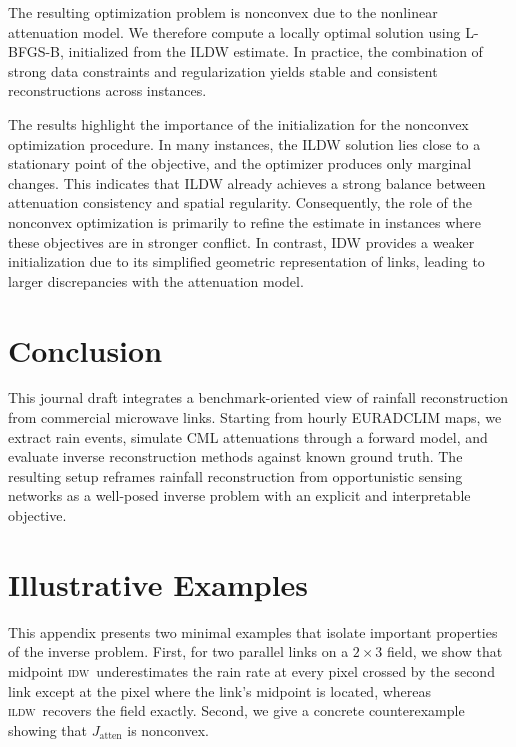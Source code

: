 \documentclass[a4paper,fleqn]{cas-sc}
\DeclareRobustCommand{\IDW}{\textsc{idw}}
\DeclareRobustCommand{\ILDW}{\textsc{ildw}}
\begin{document}
The resulting optimization problem is nonconvex due to the nonlinear attenuation model. We therefore compute a locally optimal solution using L-BFGS-B, initialized from the ILDW estimate. In practice, the combination of strong data constraints and regularization yields stable and consistent reconstructions across instances.

The results highlight the importance of the initialization for the nonconvex optimization procedure. In many instances, the ILDW solution lies close to a stationary point of the objective, and the optimizer produces only marginal changes. This indicates that ILDW already achieves a strong balance between attenuation consistency and spatial regularity. Consequently, the role of the nonconvex optimization is primarily to refine the estimate in instances where these objectives are in stronger conflict. In contrast, IDW provides a weaker initialization due to its simplified geometric representation of links, leading to larger discrepancies with the attenuation model.
\section{Conclusion}
This journal draft integrates a benchmark-oriented view of rainfall reconstruction from commercial microwave links. Starting from hourly EURADCLIM maps, we extract rain events, simulate CML attenuations through a forward model, and evaluate inverse reconstruction methods against known ground truth. The resulting setup reframes rainfall reconstruction from opportunistic sensing networks as a well-posed inverse problem with an explicit and interpretable objective.



\appendix
{}

\section{Illustrative Examples}

This appendix presents two minimal examples that isolate important properties
of the inverse problem.  First, for two parallel links on a $2\times3$ field,
we show that midpoint \IDW\ underestimates the rain rate at every pixel
crossed by the second link except at the pixel where the link's midpoint is located, whereas \ILDW\ recovers the
field exactly.  Second, we give a concrete counterexample showing that $J_{\text{atten}}$ is nonconvex.
\end{document}
